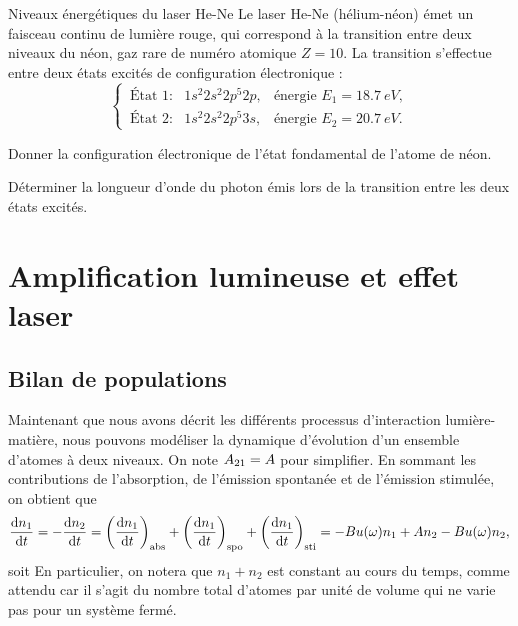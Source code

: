 \documentclass[12pt,fancy]{cours}
\begin{document}
\begin{exemple}{Niveaux énergétiques du laser He-Ne}
  Le laser He-Ne (hélium-néon) émet un faisceau continu de lumière rouge, qui correspond à la transition entre deux niveaux du néon, gaz rare de numéro atomique $Z=10$. La transition s’effectue entre deux états excités de configuration électronique :
\begin{equation}
  \left\{\,
  \begin{array}{lll}
  \text{État 1} : & 1 s^2 2 s^2 2 p^5 2 p, & \text{énergie } E_1=\SI{18,7}{eV}, \\ 
\text{État 2} : & 1 s^2 2 s^2 2 p^5 3 s, & \text{énergie } E_2=\SI{20,7}{eV}.
  \end{array}
  \right.
\end{equation}
\begin{quest}
  \item	Donner la configuration électronique de l'état fondamental de l'atome de néon.
  \item Déterminer la longueur d'onde du photon émis lors de la transition entre les deux états excités.
\end{quest}
\end{exemple}



\section{Amplification lumineuse et effet laser}

\subsection{Bilan de populations}

Maintenant que nous avons décrit les différents processus d'interaction lumière-matière, nous pouvons modéliser la dynamique d'évolution d'un ensemble d'atomes à deux niveaux. On note $A_{21}= A$ pour simplifier. En sommant les contributions de l'absorption, de l'émission spontanée et de l'émission stimulée, on obtient que
\begin{equation}
\frac{\mathrm{d}{n_1}}{\mathrm{d}{t}}=-\frac{\mathrm{d}{n_2}}{\mathrm{d}{t}}= 
\left( \frac{\mathrm{d}{n_1}}{\mathrm{d}{t}} \right)_{\rm abs} + 
\left( \frac{\mathrm{d}{n_1}}{\mathrm{d}{t}} \right)_{\rm spo} +
\left( \frac{\mathrm{d}{n_1}}{\mathrm{d}{t}} \right)_{\rm sti} = -B u(\omega)n_1 + A n_2 - B u(\omega)n_2,
\label{eq:rate_eq}
\end{equation}
soit 
En particulier, on notera que $n_1+n_2$ est constant au cours du temps, comme attendu car il s'agit du nombre total d'atomes par unité de volume qui ne varie pas pour un système fermé.
\end{document}
